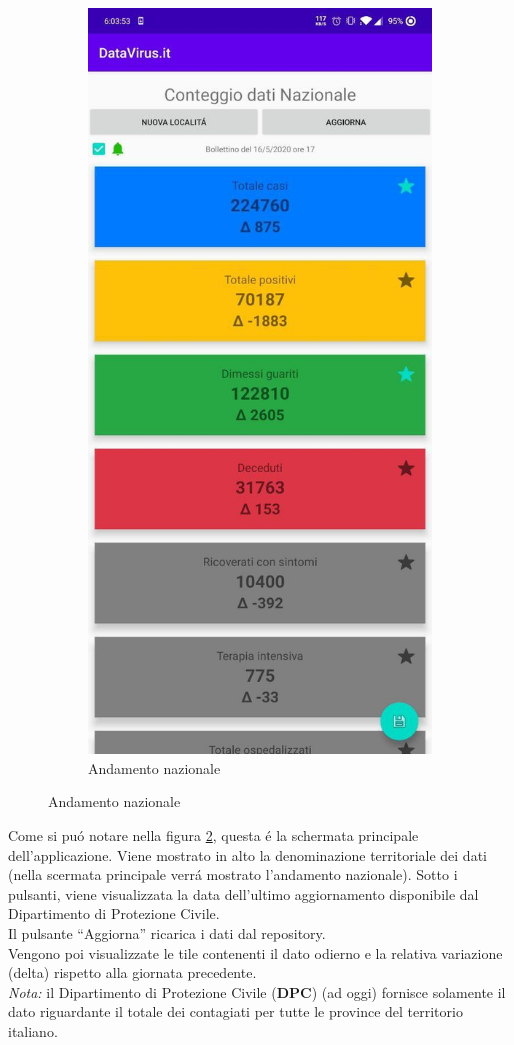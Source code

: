 \documentclass{article}
\newcommand{\quotes}[1]{``#1''}
\begin{document}
\begin{figure}[h]
\begin{subfigure}{.5\textwidth}
          \includegraphics[width=.8\linewidth]{main_activity.jpg}
          \caption{Andamento nazionale}
          \label{fig1:sub2}
        \end{subfigure}
    \end{figure}
    
    Come si puó notare nella figura \ref{fig1:sub2}, questa é la schermata principale dell'applicazione. 
    Viene mostrato in alto la denominazione territoriale dei dati (nella scermata principale verrá mostrato l'andamento nazionale). Sotto i pulsanti, viene visualizzata la data dell'ultimo aggiornamento disponibile dal Dipartimento di Protezione Civile.
    \\
    Il pulsante \quotes{Aggiorna} ricarica i dati dal repository.
    \\
    Vengono poi visualizzate le tile contenenti il dato odierno e la relativa variazione (delta) rispetto alla giornata precedente.
    \\
    \emph{Nota:} il Dipartimento di Protezione Civile (\textbf{DPC}) (ad oggi) fornisce solamente il dato riguardante il totale dei contagiati per tutte le province del territorio italiano.
    
\end{document}
